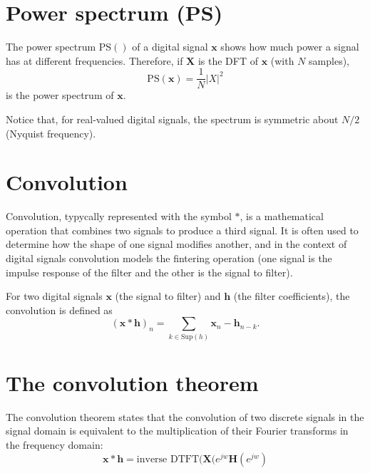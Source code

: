 
\section{Power spectrum (PS)}
\label{sec:power_spectrum}

The power spectrum $\text{PS}()$ of a digital signal $\mathbf{x}$
shows how much power a signal has at different frequencies. Therefore,
if $\mathbf{X}$ is the DFT of $\mathbf{x}$ (with $N$ samples),
\begin{equation}
  \text{PS}(\mathbf{x}) = \frac{1}{N}|X|^2
\end{equation}
is the power spectrum of $\mathbf{x}$.

Notice that, for real-valued digital signals, the spectrum is
symmetric about $N/2$ (Nyquist frequency).


\section{Convolution}
\label{sec:convolution}

Convolution, typycally represented with the symbol $\ast$, is a
mathematical operation that combines two signals to produce a third
signal. It is often used to determine how the shape of one signal
modifies another, and in the context of digital signals convolution
models the fintering operation (one signal is the impulse response of
the filter and the other is the signal to filter).

For two digital signals $\mathbf{x}$ (the signal to filter) and
$\mathbf{h}$ (the filter coefficients), the convolution is defined as
\begin{equation}
(\mathbf{x}\ast\mathbf{h})_{n}=\sum_{k\in\text{Sup}(h)}\mathbf{x}_n-\mathbf{h}_{n-k}.
\label{eq:convolution}
\end{equation}


\section{The convolution theorem}
\label{sec:convolution_theorem}
The convolution theorem states that the convolution of two discrete signals in
the signal domain is equivalent to the multiplication of their Fourier
transforms in the frequency domain:
\begin{equation}
  \mathbf{x}\ast\mathbf{h} = \text{inverse~DTFT}(\mathbf{X}(e^{jw}\mathbf{H}(e^{jw}) 
\end{equation}

